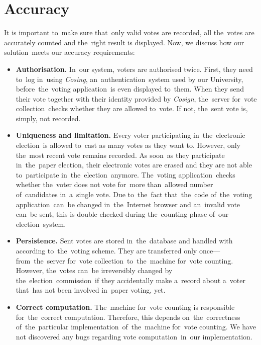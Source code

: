\section{Accuracy}
It is important to~make sure that~only valid votes are recorded, all the~votes are accurately counted and the~right result is displayed. Now, we discuss how our solution~meets our accuracy requirements:
\begin{itemize}
\item \textbf{Authorisation.} In~our system, voters are authorised twice. First, they need to~log in~using \emph{Cosing}, an~authentication~system used by our University, before~the~voting application~is even displayed to~them. When they send their vote together with their identity provided by \emph{Cosign}, the~server for~vote collection~checks whether they are allowed to~vote. If not, the~sent vote is, simply, not recorded. %
\item \textbf{Uniqueness and limitation.} Every voter participating in~the~electronic election~is allowed to~cast as many votes as they want to. However, only the~most recent vote remains recorded. As soon~as they participate in~the~paper election, their electronic votes are erased and they are not able to~participate in~the~election~anymore. The~voting application~checks whether the~voter does not vote for~more than~allowed number of~candidates in~a~single vote. Due to~the~fact that~the~code of~the~voting application~can~be changed in~the~Internet browser and an~invalid vote can~be sent, this is double-checked during the~counting phase of~our election~system.
\item \textbf{Persistence.} Sent votes are stored in~the~database and handled with according to~the~voting scheme. They are transferred only once—from~the~server for~vote collection~to~the~machine for~vote counting. However, the~votes can~be irreversibly changed by the~election~commission~if they accidentally make a~record about a~voter that~has not been involved in~paper voting, yet.
\item \textbf{Correct computation.} The~machine for~vote counting is responsible for~the~correct computation. Therefore, this depends on~the~correctness of~the~particular implementation~of~the~machine for~vote counting. We have not discovered any bugs regarding vote computation~in~our implementation.
\end{itemize}
